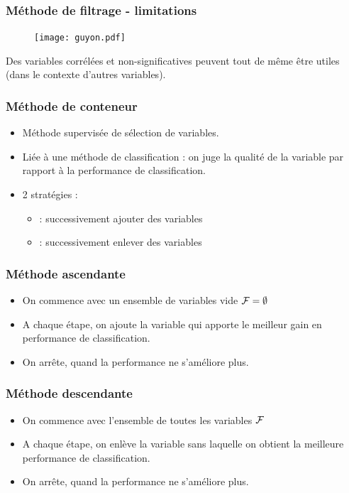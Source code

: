 \begin{frame}
  \frametitle{Méthode de filtrage - limitations}
	\begin{figure}[htb]
	  \centering
	  \texttt{[image: guyon.pdf]}
	\end{figure}
  	Des variables corrélées et non-significatives peuvent tout de même être utiles (dans le contexte d'autres variables).
\end{frame}

\begin{frame}
  \frametitle{Méthode de conteneur}
  \begin{itemize}
  	\item Méthode supervisée de sélection de variables. 
  	\item Liée à une méthode de classification : on juge la qualité de la variable par rapport à la performance de classification.
  	\item 2 stratégies : 
  	\begin{itemize}
  		\item {}: successivement ajouter des variables
  		\item {}: successivement enlever des variables
  	\end{itemize}
  \end{itemize}
\end{frame}

\begin{frame}
  \frametitle{Méthode ascendante}
  \begin{itemize}
  	\item On commence avec un ensemble de variables vide $\mathcal{F} = \emptyset$
  	\item A chaque étape, on ajoute la variable qui apporte le meilleur gain en performance de classification.
  	\item On arrête, quand la performance ne s'améliore plus. 
  \end{itemize}
\end{frame}

\begin{frame}
  \frametitle{Méthode descendante}
  \begin{itemize}
  	\item On commence avec l'ensemble de toutes les variables $\mathcal{F}$
  	\item A chaque étape, on enlève la variable sans laquelle on obtient la meilleure performance de classification.
  	\item On arrête, quand la performance ne s'améliore plus. 
  \end{itemize}
\end{frame}

